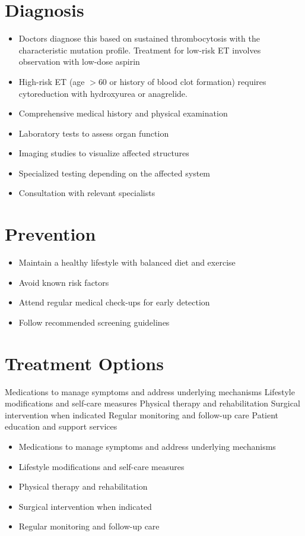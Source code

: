 \section{Diagnosis}
\begin{itemize}[noitemsep]
  \item Doctors diagnose this based on sustained thrombocytosis with the characteristic mutation profile. Treatment for low-risk ET involves observation with low-dose aspirin
  \item High-risk ET (age $>$60 or history of blood clot formation) requires cytoreduction with hydroxyurea or anagrelide.
  \item Comprehensive medical history and physical examination
  \item Laboratory tests to assess organ function
  \item Imaging studies to visualize affected structures
  \item Specialized testing depending on the affected system
  \item Consultation with relevant specialists
\end{itemize}
\section{Prevention}
\begin{itemize}[noitemsep]
  \item Maintain a healthy lifestyle with balanced diet and exercise
  \item Avoid known risk factors
  \item Attend regular medical check-ups for early detection
  \item Follow recommended screening guidelines
\end{itemize}
\section{Treatment Options}
Medications to manage symptoms and address underlying mechanisms Lifestyle modifications and self-care measures Physical therapy and rehabilitation Surgical intervention when indicated Regular monitoring and follow-up care Patient education and support services

\begin{itemize}[noitemsep]
  \item Medications to manage symptoms and address underlying mechanisms
  \item Lifestyle modifications and self-care measures
  \item Physical therapy and rehabilitation
  \item Surgical intervention when indicated
  \item Regular monitoring and follow-up care
\end{itemize}
